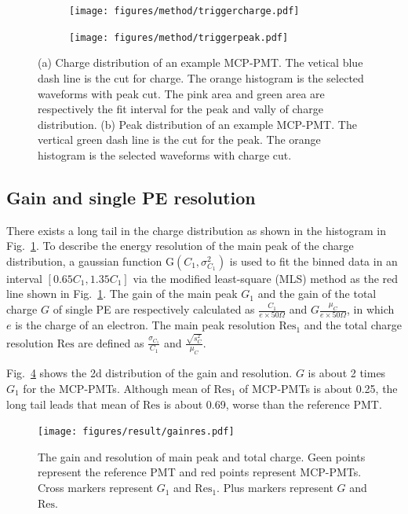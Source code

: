 \begin{figure}[!htbp]
    \centering
    \begin{subfigure}[b]{\SF\textwidth}
        \texttt{[image: figures/method/triggercharge.pdf]}
        \caption{}%
        \label{fig:triggercharge}
    \end{subfigure}
    \begin{subfigure}[b]{\SF\textwidth}
        \texttt{[image: figures/method/triggerpeak.pdf]}
        \caption{}%
        \label{fig:triggerpeak}
    \end{subfigure}
    \caption{(a) Charge distribution of an example MCP-PMT. The vetical blue dash line is the cut for charge. The orange histogram is the selected waveforms with peak cut. The pink area and green area are respectively the fit interval for the peak and vally of charge distribution. (b) Peak distribution of an example MCP-PMT. The vertical green dash line is the cut for the peak. The orange histogram is the selected waveforms with charge cut.}
\end{figure}

\subsection{Gain and single PE resolution}
\label{sec:noisegain}

There exists a long tail in the charge distribution as shown in the histogram in Fig.~\ref{fig:triggercharge}. To describe the energy resolution of the main peak of the charge distribution, a gaussian function G$(C_1,\sigma^2_{C_1})$ is used to fit the binned data in an interval $[0.65C_1, 1.35C_1]$ via the modified least-square (MLS) method \cite{Cowan1998StatisticalDA} as the red line shown in Fig.~\ref{fig:triggercharge}. The gain of the main peak $G_1$ and the gain of the total charge $G$ of single PE are respectively calculated as $\frac{C_1}{e\times 50\Omega}$ and $G\frac{\mu_{C}}{e\times 50\Omega}$, in which $e$ is the charge of an electron. The main peak resolution $\mathrm{Res}_1$ and the total charge resolution $\mathrm{Res}$ are defined as $\frac{\sigma_{C_1}}{C_1}$ and $\frac{\sqrt{s^2_{C}}}{\mu_{C}}$.

Fig.~\ref{fig:totalchargeCompare} shows the 2d distribution of the gain and resolution. $G$ is about 2 times $G_1$ for the MCP-PMTs. Although mean of $\mathrm{Res}_1$ of MCP-PMTs is about 0.25, the long tail leads that mean of $\mathrm{Res}$ is about 0.69, worse than the reference PMT.

\begin{figure}[!htbp]
    \centering
    \texttt{[image: figures/result/gainres.pdf]}
    \caption{The gain and resolution of main peak and total charge. Geen points represent the reference PMT and red points represent MCP-PMTs. Cross markers represent $G_1$ and $\mathrm{Res}_1$. Plus markers represent $G$ and $\mathrm{Res}$.}
    \label{fig:totalchargeCompare}
\end{figure}

